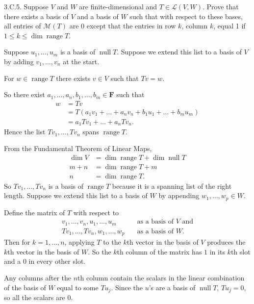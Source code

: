 \documentclass[a5paper]{article}
\begin{document}
\newcommand   \C           {\mathbf{C}}
\newcommand   \R           {\mathbf{R}}
\renewcommand \L           {\mathcal{L}}
\newcommand   \F           {\mathbf{F}}
\renewcommand \P           {\mathcal{P}}
\newcommand   \M           {\mathcal{M}}
\newcommand   \op          {\operatorname}

    3.C.5.
    Suppose $V$ and $W$ are finite-dimensional and $T \in \L(V,W)$.
    Prove that there exists a basis of $V$ and a basis of $W$ such that with respect to these bases, all entries of $\M(T)$ are 0 except that the entries in row $k$, column $k$, equal 1 if $1 \le k \le \op{dim}\op{range}T$.

    Suppose $u_1,\dots,u_m$ is a basis of $\op{null}T$.
    Suppose we extend this list to a basis of $V$ by adding $v_1,\dots,v_n$ at the start.

    For $w \in \op{range}T$ there exists $v \in V$ such that $Tv = w$.

    So there exist $a_1,\dots,a_n,b_1,\dots,b_m \in \F$ such that
\begin{align*}
        w &= Tv \\
          &= T(a_1v_1 + \dots + a_nv_n + b_1u_1 + \dots + b_mu_m) \\
          &= a_1Tv_1 + \dots + a_nTv_n .
\end{align*}
    Hence the list $Tv_1,\dots,Tv_n$ spans $\op{range}T$.

    From the Fundamental Theorem of Linear Maps,
\begin{align*}
        \op{dim}V &= \op{dim}\op{range}T + \op{dim}\op{null}T \\
            m + n &= \op{dim}\op{range}T + m \\
                n &= \op{dim}\op{range}T .
\end{align*}
    So $Tv_1,\dots,Tv_n$ is a basis of $\op{range}T$ because it is a spanning list of the right length.
    Suppose we extend this list to a basis of $W$ by appending $w_1,\dots,w_p \in W$.

    Define the matrix of $T$ with respect to
\begin{align*}
        v_1,\dots,v_n,u_1,\dots,u_m   &\quad\text{as a basis of $V$ and}\\
        Tv_1,\dots,Tv_n,w_1,\dots,w_p &\quad\text{as a basis of $W$.}
\end{align*}
    Then for $k=1,\dots,n$, applying $T$ to the $k$th vector in the basis of $V$ produces the $k$th vector in the basis of $W$.
    So the $k$th column of the matrix has $1$ in its $k$th slot and a $0$ in every other slot.

    Any columns after the $n$th column contain the scalars in the linear combination of the basis of $W$ equal to some $Tu_j$.
    Since the $u$'s are a basis of $\op{null}T$, $Tu_j = 0$, so all the scalars are 0.
\end{document}
